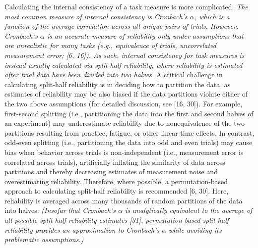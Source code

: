 \documentclass[a4paper,12pt]{article}
\begin{document}
\begin{displayquote}
    Calculating the internal consistency of a task measure is more complicated. \textit{The most common measure of internal consistency is Cronbach's $\alpha$, which is a function of the average correlation across all unique pairs of trials. However, Cronbach's $\alpha$ is an accurate measure of reliability only under assumptions that are unrealistic for many tasks (e.g., equivalence of trials, uncorrelated measurement error; [6, 16]). As such, internal consistency for task measures is instead usually calculated via split-half reliability, where reliability is estimated after trial data have been divided into two halves.} A critical challenge in calculating split-half reliability is in deciding how to partition the data, as estimates of reliability may be also biased if the data partitions violate either of the two above assumptions (for detailed discussion, see [16, 30]). For example, first-second splitting (i.e., partitioning the data into the first and second halves of an experiment) may underestimate reliability due to nonequivalence of the two partitions resulting from practice, fatigue, or other linear time effects. In contrast, odd-even splitting (i.e., partitioning the data into odd and even trials) may cause bias when behavior across trials is non-independent (i.e., measurement error is correlated across trials), artificially inflating the similarity of data across partitions and thereby decreasing estimates of measurement noise and overestimating reliability. Therefore, where possible, a permutation-based approach to calculating split-half reliability is recommended [6, 30]. Here, reliability is averaged across many thousands of random partitions of the data into halves. \textit{(Insofar that Cronbach's $\alpha$ is analytically equivalent to the average of all possible split-half reliability estimates [31], permutation-based split-half reliability provides an approximation to Cronbach's $\alpha$ while avoiding its problematic assumptions.)}
\end{displayquote}
\end{document}
